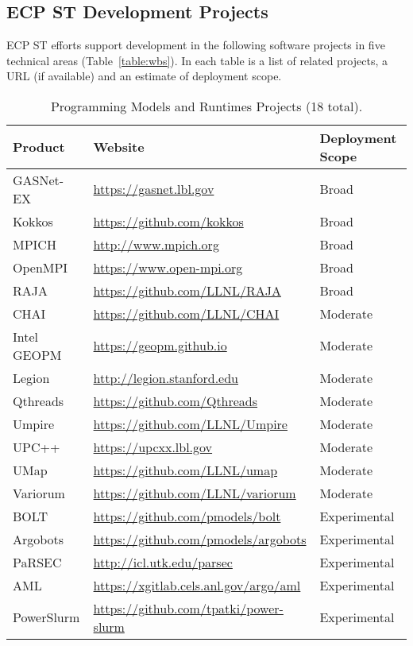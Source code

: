 \subsection{ECP ST Development Projects}\label{subsect:projects}
 ECP ST efforts support development in the following software projects in five technical areas (Table~\ref{table:wbs}). In each table is a list of related projects, a URL (if available) and an estimate of deployment scope.

\begin{table}
	\begin{tabular}{|l|l|l|}\hline
		\rowcolor{LightCyan}
		\textbf{Product} & \textbf{Website} & \textbf{Deployment Scope}\\\hline
		GASNet-EX & \url{https://gasnet.lbl.gov} & Broad\\\hline
		Kokkos & \url{https://github.com/kokkos} & Broad\\\hline
		MPICH & \url{http://www.mpich.org} & Broad\\\hline
		OpenMPI & \url{https://www.open-mpi.org} & Broad\\\hline
		RAJA & \url{https://github.com/LLNL/RAJA} & Broad\\\hline

		CHAI & \url{https://github.com/LLNL/CHAI} & Moderate\\\hline
		Intel GEOPM & \url{https://geopm.github.io} & Moderate\\\hline
		Legion & \url{http://legion.stanford.edu} & Moderate\\\hline
		Qthreads & \url{https://github.com/Qthreads} & Moderate\\\hline
		Umpire & \url{https://github.com/LLNL/Umpire} & Moderate\\\hline
		UPC++ & \url{https://upcxx.lbl.gov} & Moderate\\\hline
		UMap & \url{https://github.com/LLNL/umap} & Moderate\\\hline
		Variorum & \url{https://github.com/LLNL/variorum} & Moderate\\\hline

		BOLT & \url{https://github.com/pmodels/bolt} & Experimental\\\hline
		Argobots & \url{https://github.com/pmodels/argobots} & Experimental\\\hline
		PaRSEC & \url{http://icl.utk.edu/parsec} & Experimental\\\hline
		AML & \url{https://xgitlab.cels.anl.gov/argo/aml} & Experimental\\\hline
		PowerSlurm & \url{https://github.com/tpatki/power-slurm} & Experimental\\\hline
	\end{tabular}
\caption{\label{table:pmr-products} Programming Models and Runtimes Projects (18 total).}
\end{table}

